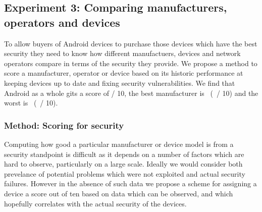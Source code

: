 \subsection{Experiment 3: Comparing manufacturers, operators and devices}
\label{sec:security_scoring}\label{sec:exp:security_score}

To allow buyers of Android devices to purchase those devices which have the best security they need to know how different manufactuers, devices and network operators compare in terms of the security they provide.
We propose a method to score a manufacturer, operator or device based on its historic performance at keeping devices up to date and fixing security vulnerabilities.
We find that Android as a whole gits a score of \daSecurityScore / 10, the best manufacturer is \daSecScoreBestmanufacturer\ (\daSecScoreBestmanufacturerScore\ / 10) and the worst is \daSecScoreWorstmanufacturer\ (\daSecScoreWorstmanufacturerScore\ / 10).

\subsubsection{Method: Scoring for security}

Computing how good a particular manufacturer or device model is from a security standpoint is difficult as it depends on a number of factors which are hard to observe, particularly on a large scale.
Ideally we would consider both prevelance of potential problems which were not exploited and actual security failures.
However in the absence of such data we propose a scheme for assigning a device a score out of ten based on data which can be observed, and which hopefully correlates with the actual security of the devices.

